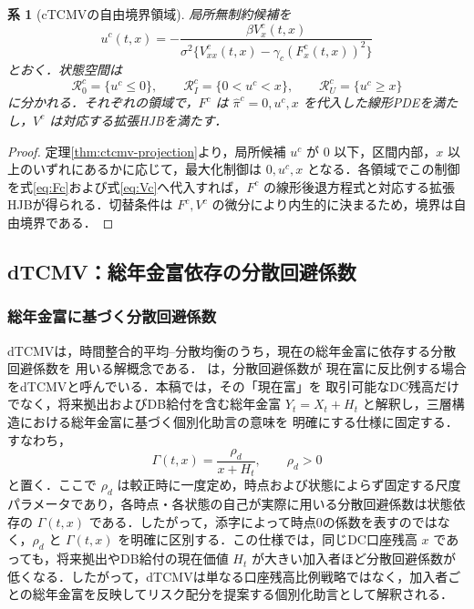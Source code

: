 \documentclass[10pt,a4paper]{article}
\theoremstyle{plain}
\newtheorem{corollary}{系}
\theoremstyle{definition}
\begin{document}
\begin{corollary}[cTCMVの自由境界領域]
局所無制約候補を
\[
  u^c(t,x)=
  -\frac{\beta V_x^c(t,x)}{\sigma^2\{V_{xx}^c(t,x)-\gamma_c(F_x^c(t,x))^2\}}
\]
とおく．状態空間は
\[
  \mathcal R_0^c=\{u^c\leq0\},\qquad
  \mathcal R_I^c=\{0<u^c<x\},\qquad
  \mathcal R_U^c=\{u^c\geq x\}
\]
に分かれる．それぞれの領域で，$F^c$ は $\hat\pi^c=0,u^c,x$ を代入した線形PDEを満たし，$V^c$ は対応する拡張HJBを満たす．
\end{corollary}

\begin{proof}
定理\ref{thm:ctcmv-projection}より，局所候補 $u^c$ が $0$ 以下，区間内部，$x$ 以上のいずれにあるかに応じて，最大化制御は $0,u^c,x$ となる．各領域でこの制御を式\eqref{eq:Fc}および式\eqref{eq:Vc}へ代入すれば，$F^c$ の線形後退方程式と対応する拡張HJBが得られる．切替条件は $F^c,V^c$ の微分により内生的に決まるため，境界は自由境界である．
\end{proof}

\subsection{dTCMV：総年金富依存の分散回避係数}
\label{sec:dtcmv}


\subsubsection{総年金富に基づく分散回避係数}

dTCMVは，時間整合的平均--分散均衡のうち，現在の総年金富に依存する分散回避係数を
用いる解概念である．\citet{vanStadenDangForsyth2021} は，分散回避係数が
現在富に反比例する場合をdTCMVと呼んでいる．本稿では，その「現在富」を
取引可能なDC残高だけでなく，将来拠出およびDB給付を含む総年金富
$Y_t=X_t+H_t$ と解釈し，三層構造における総年金富に基づく個別化助言の意味を
明確にする仕様に固定する．すなわち，
\begin{equation}
  \Gamma(t,x)=\frac{\rho_d}{x+H_t},
  \qquad \rho_d>0
  \label{eq:Gamma-total}
\end{equation}
と置く．ここで $\rho_d$ は較正時に一度定め，時点および状態によらず固定する尺度パラメータであり，各時点・各状態の自己が実際に用いる分散回避係数は状態依存の $\Gamma(t,x)$ である．したがって，添字によって時点0の係数を表すのではなく，$\rho_d$ と $\Gamma(t,x)$ を明確に区別する．この仕様では，同じDC口座残高 $x$ であっても，将来拠出やDB給付の現在価値 $H_t$ が大きい加入者ほど分散回避係数が低くなる．したがって，dTCMVは単なる口座残高比例戦略ではなく，加入者ごとの総年金富を反映してリスク配分を提案する個別化助言として解釈される．
\end{document}
